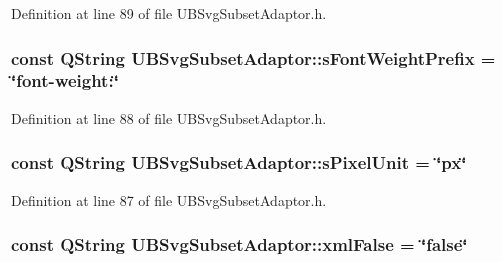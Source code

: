 Definition at line 89 of file U\-B\-Svg\-Subset\-Adaptor.\-h.

\hypertarget{class_u_b_svg_subset_adaptor_ac9df97e19b9bfd3de1064adae0b371f8}{
\subsubsection[{s\-Font\-Weight\-Prefix}]{\setlength{\rightskip}{0pt plus 5cm}const Q\-String U\-B\-Svg\-Subset\-Adaptor\-::s\-Font\-Weight\-Prefix = \char`\"{}font-\/weight\-:\char`\"{}\hspace{0.3cm}{\ttfamily [static]}}}\label{d3/df9/class_u_b_svg_subset_adaptor_ac9df97e19b9bfd3de1064adae0b371f8}


Definition at line 88 of file U\-B\-Svg\-Subset\-Adaptor.\-h.

\hypertarget{class_u_b_svg_subset_adaptor_a3d5cad8803cfd188f7849d59d6bd6d9c}{
\subsubsection[{s\-Pixel\-Unit}]{\setlength{\rightskip}{0pt plus 5cm}const Q\-String U\-B\-Svg\-Subset\-Adaptor\-::s\-Pixel\-Unit = \char`\"{}px\char`\"{}\hspace{0.3cm}{\ttfamily [static]}}}\label{d3/df9/class_u_b_svg_subset_adaptor_a3d5cad8803cfd188f7849d59d6bd6d9c}


Definition at line 87 of file U\-B\-Svg\-Subset\-Adaptor.\-h.

\hypertarget{class_u_b_svg_subset_adaptor_a1adfffd7e1374c84381c932b0e15e218}{
\subsubsection[{xml\-False}]{\setlength{\rightskip}{0pt plus 5cm}const Q\-String U\-B\-Svg\-Subset\-Adaptor\-::xml\-False = \char`\"{}false\char`\"{}\hspace{0.3cm}{\ttfamily [static]}}}\label{d3/df9/class_u_b_svg_subset_adaptor_a1adfffd7e1374c84381c932b0e15e218}


